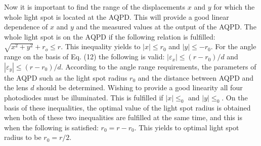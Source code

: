 \documentclass[10pt]{article}
\begin{document}
Now it is important to find the range of the displacements \(x\) and \(y\) for which the whole light spot is located at the AQPD. This will provide a good linear dependence of \(x\) and \(y\) and the measured values at the output of the AQPD. The whole light spot is on the \(\mathrm{AQPD}\) if the following relation is fulfilled: \(\sqrt{x^{2}+y^{2}}+r_{o} \leq r\). This inequality yields to \(|x| \leq r_{0}\) and \(|y| \leq-r_{0}\). For the angle range on the basis of Eq. (12) the following is valid: \(\left|\varepsilon_{x}\right| \leq\left(r-r_{0}\right) / d\) and \(\left|\varepsilon_{y}\right| \leq\left(r-r_{0}\right) / d\). According to the angle range requirements, the parameters of the AQPD such as the light spot radius \(r_{0}\) and the distance between AQPD and the lens \(d\) should be determined. Wishing to provide a good linearity all four photodiodes must be illuminated. This is fulfilled if \(|x| \leq_{0}\) and \(|y| \leq_{0}\). On the basis of these inequalities, the optimal value of the light spot radius is obtained when both of these two inequalities are fulfilled at the same time, and this is when the following is satisfied: \(r_{0}=r-r_{0}\). This yields to optimal light spot radius to be \(r_{0}=r / 2\).
\end{document}
